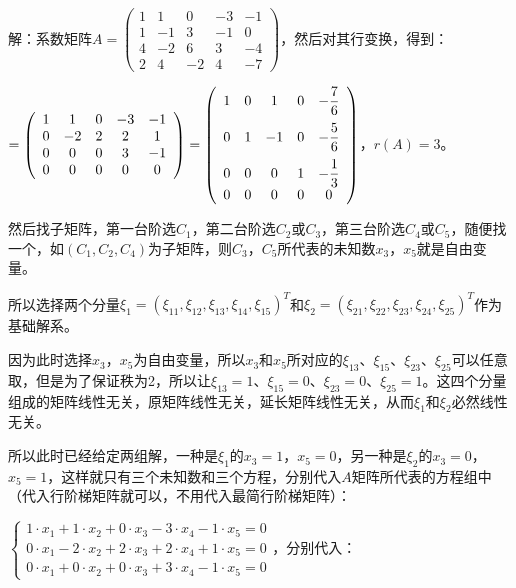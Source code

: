 \documentclass[UTF8, 12pt]{ctexart}
\begin{document}
解：系数矩阵$A=\left(\begin{array}{ccccc}
1 & 1 & 0 & -3 & -1 \\
1 & -1 & 3 & -1 & 0 \\
4 & -2 & 6 & 3 & -4 \\
2 & 4 & -2 & 4 & -7
\end{array}\right)$，然后对其行变换，得到：

$=\left(\begin{array}{ccccc}
1 & 1 & 0 & -3 & -1 \\
0 & -2 & 2 & 2 & 1 \\
0 & 0 & 0 & 3 & -1 \\
0 & 0 & 0 & 0 & 0
\end{array}\right)=\left(\begin{array}{ccccc}
1 & 0 & 1 & 0 & -\dfrac{7}{6} \medskip \\
0 & 1 & -1 & 0 & -\dfrac{5}{6} \medskip \\
0 & 0 & 0 & 1 & -\dfrac{1}{3} \\
0 & 0 & 0 & 0 & 0
\end{array}\right)$，$r(A)=3$。

然后找子矩阵，第一台阶选$C_1$，第二台阶选$C_2$或$C_3$，第三台阶选$C_4$或$C_5$，随便找一个，如$(C_1,C_2,C_4)$为子矩阵，则$C_3$，$C_5$所代表的未知数$x_3$，$x_5$就是自由变量。

所以选择两个分量$\xi_1=(\xi_{11},\xi_{12},\xi_{13},\xi_{14},\xi_{15})^T$和$\xi_2=(\xi_{21},\xi_{22},\xi_{23},\xi_{24},\xi_{25})^T$作为基础解系。

因为此时选择$x_3$，$x_5$为自由变量，所以$x_3$和$x_5$所对应的$\xi_{13}$、$\xi_{15}$、$\xi_{23}$、$\xi_{25}$可以任意取，但是为了保证秩为2，所以让$\xi_{13}=1$、$\xi_{15}=0$、$\xi_{23}=0$、$\xi_{25}=1$。这四个分量组成的矩阵线性无关，原矩阵线性无关，延长矩阵线性无关，从而$\xi_1$和$\xi_2$必然线性无关。

所以此时已经给定两组解，一种是$\xi_1$的$x_3=1$，$x_5=0$，另一种是$\xi_2$的$x_3=0$，$x_5=1$，这样就只有三个未知数和三个方程，分别代入$A$矩阵所代表的方程组中（代入行阶梯矩阵就可以，不用代入最简行阶梯矩阵）：

$\left\{\begin{array}{l}
1\cdot x_1+1\cdot x_2+0\cdot x_3-3\cdot x_4-1\cdot x_5=0 \\
0\cdot x_1-2\cdot x_2+2\cdot x_3+2\cdot x_4+1\cdot x_5=0 \\
0\cdot x_1+0\cdot x_2+0\cdot x_3+3\cdot x_4-1\cdot x_5=0
\end{array}\right.$，分别代入：
\end{document}
